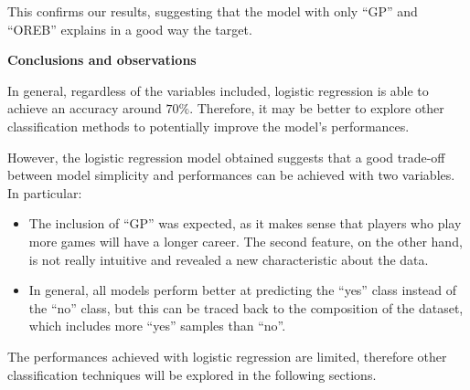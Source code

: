 This confirms our results, suggesting that the model with only ``GP'' and ``OREB'' explains in a good way the target. 

\vspace{0.2cm}
\textbf{Conclusions and observations}

In general, regardless of the variables included, logistic regression is able to achieve an accuracy around $70\%$. Therefore, it may be better to explore other classification methods to potentially improve the model's performances.

However, the logistic regression model obtained suggests that a good trade-off between model simplicity and performances can be achieved with two variables. In particular:

\begin{itemize}
	\item The inclusion of ``GP'' was expected, as it makes sense that players who play more games will have a longer career. The second feature, on the other hand, is not really intuitive and revealed a new characteristic about the data.
	\item In general, all models perform better at predicting the ``yes'' class instead of the ``no'' class, but this can be traced back to the composition of the dataset, which includes more ``yes'' samples than ``no''.
\end{itemize}

The performances achieved with logistic regression are limited, therefore other classification techniques will be explored in the following sections.
